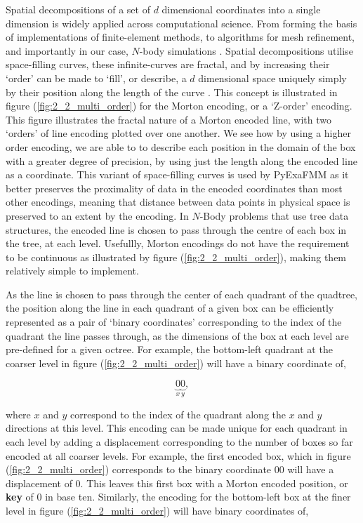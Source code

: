 Spatial decompositions of a set of $d$ dimensional coordinates into a single
dimension is widely applied across computational science.
From forming the basis of implementations of finite-element methods, to algorithms
for mesh refinement, and importantly in our case, $N$-body simulations
\cite{Sundar:2008:SIAM}. Spatial decompositions utilise space-filling curves,
these infinite-curves are fractal, and by increasing their `order' can be made
to `fill', or describe, a $d$ dimensional space uniquely simply by their position
along the length of the curve \cite{Campbell:2003:Williams}. This concept is
illustrated in figure (\ref{fig:2_2_multi_order}) for the Morton encoding, or a
`Z-order' encoding.  This figure illustrates the fractal nature of a Morton
encoded line, with two `orders' of line encoding plotted over one another. We see
how by using a higher order encoding, we are able to to describe each position
in the domain of the box with a greater degree of precision, by using just
the length along the encoded line as a coordinate. This variant of space-filling
curves is used by \gls{PyExaFMM} as it better preserves the proximality of data
in the encoded coordinates than most other encodings, meaning that distance
between data points in physical space is preserved to an extent by the encoding. In $N$-Body
problems that use tree data structures, the encoded line is chosen to pass through
the centre of each box in the tree, at each level. Usefullly, Morton encodings
do not have the requirement to be continuous as illustrated by figure
(\ref{fig:2_2_multi_order}), making them relatively simple to implement.

As the line is chosen to pass through the center of each quadrant of the quadtree,
 the position along the line in each quadrant of a given box can be efficiently represented
 as a pair of `binary coordinates' corresponding to the index of the quadrant the line
 passes through, as the dimensions of the box at each level are pre-defined for a
 given octree. For example, the bottom-left quadrant at the coarser level in figure (\ref{fig:2_2_multi_order})
 will have a binary coordinate of,

 \begin{equation}
     \underbrace{0}_{x}\underbrace{0}_{y},
 \end{equation}

 where $x$ and $y$ correspond to the index of the quadrant along the $x$ and $y$
 directions at this level. This encoding can be made unique for each
 quadrant in each level by adding a displacement corresponding to the number of boxes so far
 encoded at all coarser levels. For example, the first encoded box, which in figure (\ref{fig:2_2_multi_order})
 corresponds to the binary coordinate $00$ will have a displacement of 0.
 This leaves this first box with a Morton encoded position, or \textbf{\gls{key}}
 of 0 in base ten. Similarly, the encoding for the bottom-left box at the finer
 level in figure (\ref{fig:2_2_multi_order}) will have binary coordinates of,


